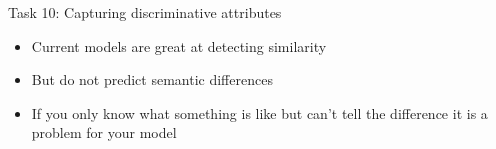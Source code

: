 \documentclass[10pt, compress]{beamer}
\begin{document}



\begin{frame}{Task 10: Capturing discriminative attributes}

\begin{itemize}
  \item Current models are great at detecting similarity
  \item But do not predict semantic differences
  \item If you only know what something is like but can't tell the difference it is a problem for your model
\end{itemize}


\end{frame}
\end{document}
